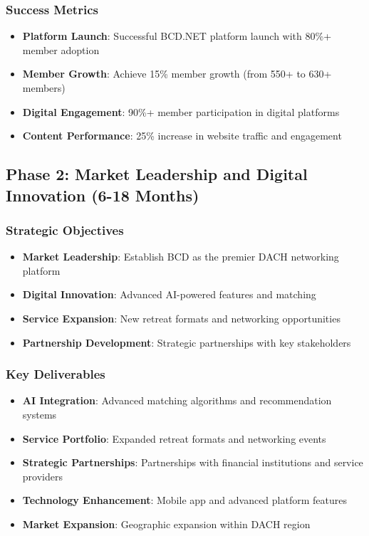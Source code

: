 \subsubsection{Success Metrics}
\begin{itemize}
    \item \textbf{Platform Launch}: Successful BCD.NET platform launch with 80\%+ member adoption
    \item \textbf{Member Growth}: Achieve 15\% member growth (from 550+ to 630+ members)
    \item \textbf{Digital Engagement}: 90\%+ member participation in digital platforms
    \item \textbf{Content Performance}: 25\% increase in website traffic and engagement
\end{itemize}

\subsection{Phase 2: Market Leadership and Digital Innovation (6-18 Months)}

\subsubsection{Strategic Objectives}
\begin{itemize}
    \item \textbf{Market Leadership}: Establish BCD as the premier DACH networking platform
    \item \textbf{Digital Innovation}: Advanced AI-powered features and matching
    \item \textbf{Service Expansion}: New retreat formats and networking opportunities
    \item \textbf{Partnership Development}: Strategic partnerships with key stakeholders
\end{itemize}

\subsubsection{Key Deliverables}
\begin{itemize}
    \item \textbf{AI Integration}: Advanced matching algorithms and recommendation systems
    \item \textbf{Service Portfolio}: Expanded retreat formats and networking events
    \item \textbf{Strategic Partnerships}: Partnerships with financial institutions and service providers
    \item \textbf{Technology Enhancement}: Mobile app and advanced platform features
    \item \textbf{Market Expansion}: Geographic expansion within DACH region
\end{itemize}

